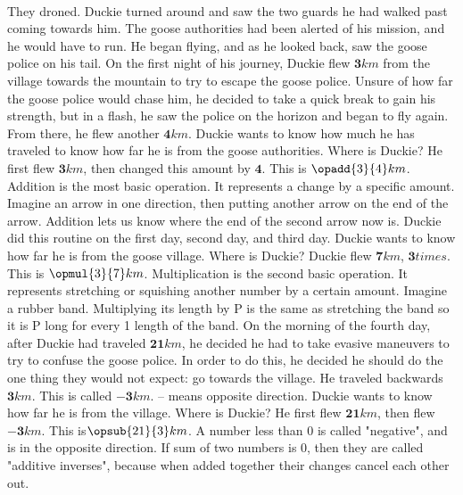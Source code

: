 \paragraph{} They droned. Duckie turned around and saw the two guards he had walked past coming towards him. The goose authorities had been alerted of his mission, and he would have to run. He began flying, and as he looked back, saw the goose police on his tail. 
\vfill
\pagebreak
{On the first night of his journey, Duckie flew $\mathbf{3} km$ from the village towards the mountain to try to escape the goose police. Unsure of how far the goose police would chase him, he decided to take a quick break to gain his strength, but in a flash, he saw the police on the horizon and began to fly again. From there, he flew another $\mathbf{4} km$. Duckie wants to know how much he has traveled to know how far he is from the goose authorities. Where is Duckie?}
{He first flew $\mathbf{3} km$, then changed this amount by $\mathbf{4}$. This is $\opadd{3}{4} km$.}
{Addition is the most basic operation. It represents a change by a specific amount. Imagine an arrow in one direction, then putting another arrow on the end of the arrow. Addition lets us know where the end of the second arrow now is.} 
{}
{Duckie did this routine on the first day, second day, and third day.  Duckie wants to know how far he is from the goose village. Where is Duckie?}
{Duckie flew $\mathbf{7} km$, $\mathbf{3} times$. This is $\opmul{3}{7} km$.}
{Multiplication is the second basic operation. It represents stretching or squishing another number by a certain amount. Imagine a rubber band. Multiplying its length by P is the same as stretching the band so it is P long for every 1 length of the band.}
{}
{On the morning of the fourth day, after Duckie had traveled $\mathbf{21} km$, he decided he had to take evasive maneuvers to try to confuse the goose police. In order to do this, he decided he should do the one thing they would not expect: go towards the village. He traveled backwards $\mathbf{3} km$. This is called $\mathbf{-3} km$. \linebreak – means opposite direction. Duckie wants to know how far he is from the village. Where is Duckie?}
{He first flew $\mathbf{21} km$, then flew $\mathbf{-3} km$. This is$ \opsub{21}{3} km$.}
{A number less than 0 is called "negative", and is in the opposite direction. If sum of two numbers is 0, then they are called "additive inverses", because when added together their changes cancel each other out.}

